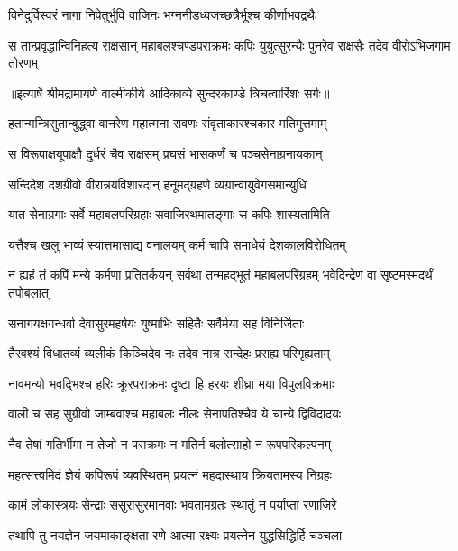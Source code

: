 \twolineshloka
{विनेदुर्विस्वरं नागा निपेतुर्भुवि वाजिनः}
{भग्ननीडध्वजच्छत्रैर्भूश्च कीर्णाभवद्रथैः} %

\fourlineindentedshloka
{स तान्प्रवृद्धान्विनिहत्य राक्षसान्}
{महाबलश्चण्डपराक्रमः कपिः}
{युयुत्सुरन्यैः पुनरेव राक्षसैः}
{तदेव वीरोऽभिजगाम तोरणम्} %


{॥इत्यार्षे श्रीमद्रामायणे वाल्मीकीये आदिकाव्ये सुन्दरकाण्डे त्रिचत्वारिंशः सर्गः॥}


\twolineshloka
{हतान्मन्त्रिसुतान्बुद्ध्वा वानरेण महात्मना}
{रावणः संवृताकारश्चकार मतिमुत्तमाम्} %

\twolineshloka
{स विरूपाक्षयूपाक्षौ दुर्धरं चैव राक्षसम्}
{प्रघसं भासकर्णं च पञ्चसेनाग्रनायकान्} %

\twolineshloka
{सन्दिदेश दशग्रीवो वीरान्नयविशारदान्}
{हनूमद्ग्रहणे व्यग्रान्वायुवेगसमान्युधि} %

\twolineshloka
{यात सेनाग्रगाः सर्वे महाबलपरिग्रहाः}
{सवाजिरथमातङ्गाः स कपिः शास्यतामिति} %

\twolineshloka
{यत्तैश्च खलु भाव्यं स्यात्तमासाद्य वनालयम्}
{कर्म चापि समाधेयं देशकालविरोधितम्} %

\threelineshloka
{न ह्यहं तं कपिं मन्ये कर्मणा प्रतितर्कयन्}
{सर्वथा तन्महद्भूतं महाबलपरिग्रहम्}
{भवेदिन्द्रेण वा सृष्टमस्मदर्थं तपोबलात्} %

\twolineshloka
{सनागयक्षगन्धर्वा देवासुरमहर्षयः}
{युष्माभिः सहितैः सर्वैर्मया सह विनिर्जिताः} %

\twolineshloka
{तैरवश्यं विधातव्यं व्यलीकं किञ्चिदेव नः}
{तदेव नात्र सन्देहः प्रसह्य परिगृह्यताम्} %

\twolineshloka
{नावमन्यो भवद्भिश्च हरिः क्रूरपराक्रमः}
{दृष्टा हि हरयः शीघ्रा मया विपुलविक्रमाः} %

\twolineshloka
{वाली च सह सुग्रीवो जाम्बवांश्च महाबलः}
{नीलः सेनापतिश्चैव ये चान्ये द्विविदादयः} %

\twolineshloka
{नैव तेषां गतिर्भीमा न तेजो न पराक्रमः}
{न मतिर्न बलोत्साहो न रूपपरिकल्पनम्} %

\twolineshloka
{महत्सत्त्वमिदं ज्ञेयं कपिरूपं व्यवस्थितम्}
{प्रयत्नं महदास्थाय क्रियतामस्य निग्रहः} %

\twolineshloka
{कामं लोकास्त्रयः सेन्द्राः ससुरासुरमानवाः}
{भवतामग्रतः स्थातुं न पर्याप्ता रणाजिरे} %

\twolineshloka
{तथापि तु नयज्ञेन जयमाकाङ्क्षता रणे}
{आत्मा रक्ष्यः प्रयत्नेन युद्धसिद्धिर्हि चञ्चला} %

